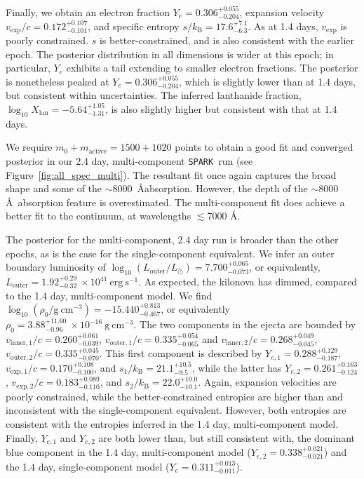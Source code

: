 \documentclass[twocolumn,twocolappendix]{aastex63}
\def\SPARK{\texttt{SPARK}}
\begin{document}
Finally, we obtain an electron fraction $Y_e = 0.306^{+0.055}_{-0.204}$, expansion velocity $v_{\mathrm{exp}}/c = 0.172^{+0.107}_{-0.101}$, and specific entropy $s/k_{\mathrm{B}} = 17.6^{+7.1}_{-6.3}$. As at 1.4 days, $v_{\mathrm{exp}}$ is poorly constrained. $s$ is better-constrained, and is also consistent with the earlier epoch. The posterior distribution in all dimensions is wider at this epoch; in particular, $Y_e$ exhibits a tail extending to smaller electron fractions. The posterior is nonetheless peaked at $Y_e = 0.306^{+0.055}_{-0.204}$, which is slightly lower than at 1.4 days, but consistent within uncertainties. The inferred lanthanide fraction, $\log_{10} X_{\mathrm{lan}} = -5.64^{+1.05}_{-1.31}$, is also slightly higher but consistent with that at 1.4 days.

We require $m_0 + m_{\mathrm{active}} = 1500 + 1020$ points to obtain a good fit and converged posterior in our 2.4 day, multi-component \SPARK~run (see Figure~\ref{fig:all_spec_multi}). The resultant fit once again captures the broad shape and some of the $\sim$8000~\AA absorption. However, the depth of the $\sim$8000 \AA~absorption feature is overestimated. The multi-component fit does achieve a better fit to the continuum, at wavelengths $\lesssim$7000 \AA. 

The posterior for the multi-component, 2.4 day run is broader than the other epochs, as is the case for the single-component equivalent. We infer an outer boundary luminosity of $\log_{10} (L_{\mathrm{outer}}/L_{\odot}) = 7.700^{+0.065}_{-0.073}$, or equivalently, $L_{\mathrm{outer}} = 1.92^{+0.29}_{-0.32}~\times 10^{41}~\mathrm{erg~s^{-1}}$. As expected, the kilonova has dimmed, compared to the 1.4 day, multi-component model. We find $\log_{10} (\rho_0 / \mathrm{g~cm^{-3}}) = -15.440^{+0.813}_{-0.467}$, or equivalently $\rho_0 = 3.88^{+11.60}_{-0.96}~\times 10^{-16}~\mathrm{g~cm^{-3}}$. The two components in the ejecta are bounded by $v_{\mathrm{inner,1}}/c = 0.260^{+0.061}_{-0.039}$, $v_{\mathrm{outer,1}}/c = 0.335^{+0.054}_{-0.065}$ and $v_{\mathrm{inner,2}}/c = 0.268^{+0.049}_{-0.045}$, $v_{\mathrm{outer,2}}/c = 0.335^{+0.045}_{-0.070}$. This first component is described by $Y_{e,1} = 0.288^{+0.129}_{-0.187}$, $v_{\mathrm{exp},1}/c = 0.170^{+0.108}_{-0.100}$, and $s_1 / k_{\mathrm{B}} = 21.1^{+10.5}_{-9.5}$, while the latter has $Y_{e,2} = 0.261^{+0.163}_{-0.124}$, $v_{\mathrm{exp},2}/c = 0.183^{+0.089}_{-0.110}$, and $s_2 / k_{\mathrm{B}} = 22.0^{+10.0}_{-10.1}$. Again, expansion velocities are poorly constrained, while the better-constrained entropies are higher than and inconsistent with the single-component equivalent. However, both entropies are consistent with the entropies inferred in the 1.4 day, multi-component model. Finally, $Y_{e,1}$ and $Y_{e,2}$ are both lower than, but still consistent with, the dominant blue component in the 1.4 day, multi-component model ($Y_{e,2} = 0.338^{+0.021}_{-0.021}$) and the 1.4 day, single-component model ($Y_e = 0.311^{+0.013}_{-0.011}$). 
\end{document}
